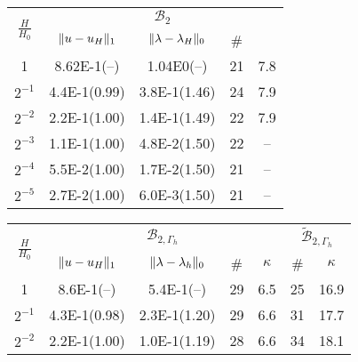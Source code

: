 \begin{table}
    \scriptsize{%
  \begin{center}
    \begin{tabular}{c|cccc}%
      \hline
      \multirow{2}{*}{$\frac{H}{H_0}$} & \multicolumn{4}{c}{$\mathcal{B}_2$}\\ %
      \cline{2-5}
      & $\lVert{u-u_H}\rVert_1$ & $\lVert{\lambda-\lambda_H}\rVert_0$ & \#\\%
      \hline
1        & 8.62E-1(--)  & 1.04E0(--)    &   21 & 7.8\\ %
$2^{-1}$ & 4.4E-1(0.99) & 3.8E-1(1.46)  & 24   & 7.9\\ %
$2^{-2}$ & 2.2E-1(1.00) & 1.4E-1(1.49)  & 22   & 7.9\\ %
$2^{-3}$ & 1.1E-1(1.00) & 4.8E-2(1.50)  & 22   & -- \\ %
$2^{-4}$ & 5.5E-2(1.00) & 1.7E-2(1.50)  & 21   & -- \\ %
$2^{-5}$ & 2.7E-2(1.00) & 6.0E-3(1.50)  & 21   & -- \\ %
\hline
  \end{tabular}
  \end{center}
    }
    \vspace{5pt}
  \scriptsize{%
    \begin{minipage}{0.49\textwidth}
  \begin{center}
    \begin{tabular}{c|cccc||cc}
      \hline
      \multirow{2}{*}{$\frac{H}{H_0}$} & \multicolumn{4}{c||}{$\mathcal{B}_{2, \Gamma_h}$} & \multicolumn{2}{c}{$\tilde{\mathcal{B}}_{2, \Gamma_h}$}\\
      \cline{2-7}
      & $\lVert{u-u_H}\rVert_1$ & $\lVert{\lambda-\lambda_h}\rVert_0$ & \# & $\kappa$ & \# & $\kappa$\\
      \hline
1       & 8.6E-1(--) & 5.4E-1(--)    & 29 & 6.5 & 25 & 16.9\\
$2^{-1}$ & 4.3E-1(0.98) & 2.3E-1(1.20)& 29 & 6.6 & 31 & 17.7\\
$2^{-2}$ & 2.2E-1(1.00) & 1.0E-1(1.19)& 28 & 6.6 & 34 & 18.1\\

\end{tabular}
\end{center}
\end{minipage}}
\end{table}
